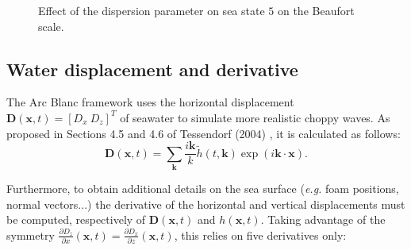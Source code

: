 \documentclass[final]{jcgt}
\def\Framework{The Arc Blanc framework\xspace}
\begin{document}
\begin{figure}[htbp]
	\centering

	\hspace{1cm}
	\caption{Effect of the dispersion parameter on sea state $5$ on the Beaufort scale.}
	\label{fig:dispersionEffect}
\end{figure}

\subsection{Water displacement and derivative}

\Framework uses the horizontal displacement $\mathbf{D}(\mathbf x,t) = \left[D_x\ D_z\right]^T$ of seawater to simulate more realistic choppy waves.
As proposed in Sections 4.5 and 4.6 of Tessendorf (2004) \cite{tessendorfSimulatingOceanWater1999}, it is calculated as follows:
\begin{equation}\label{equa:hori-displacement}
	\mathbf{D}(\mathbf x,t) = \sum_{\mathbf{k}} \frac{i\mathbf{k}}{k} \tilde{h}(t, \mathbf{k})\exp\left(i\mathbf{k}\cdot\mathbf x\right).
\end{equation}

Furthermore, to obtain additional details on the sea surface (\emph{e.g.} foam positions, normal vectors...) the derivative of the horizontal and vertical displacements must be computed, respectively of $\mathbf{D}(\mathbf x,t)$ and $h(\mathbf x,t)$.
Taking advantage of the symmetry $\frac{\partial D_z}{\partial x}(\mathbf x,t) = \frac{\partial D_x}{\partial z}(\mathbf x,t)$, this relies on five derivatives only:
\end{document}
